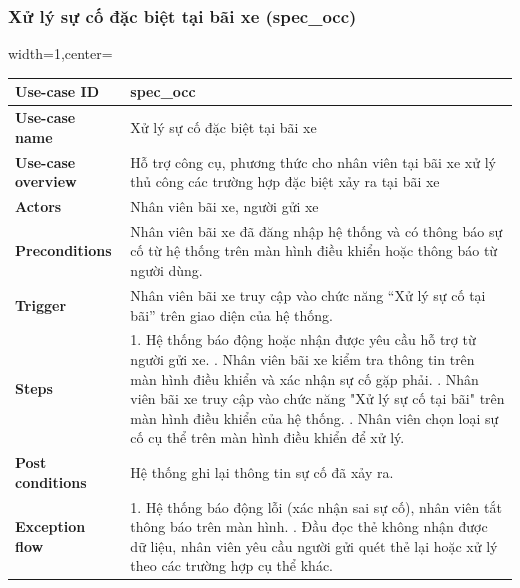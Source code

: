 \subsubsection{Xử lý sự cố đặc biệt tại bãi xe (spec\_occ)}
\begin{adjustbox}{width=1\textwidth,center=\textwidth}
\small
\begin{tabular}{|>{\centering\arraybackslash}m{3.5cm}|m{13.2cm}|}
\hline
\textbf{Use-case ID} & spec\_occ \\ \hline
\textbf{Use-case name} & Xử lý sự cố đặc biệt tại bãi xe  \\ \hline
\textbf{Use-case overview} & Hỗ trợ công cụ, phương thức cho nhân viên tại bãi xe xử lý thủ công các trường hợp đặc biệt xảy ra tại bãi xe   \\ \hline
\textbf{Actors} & Nhân viên bãi xe, người gửi xe  \\ \hline
\textbf{Preconditions} & Nhân viên bãi xe đã đăng nhập hệ thống và có thông báo sự cố từ hệ thống trên màn hình điều khiển hoặc thông báo từ người dùng. \\ \hline
\textbf{Trigger} & Nhân viên bãi xe truy cập vào chức năng “Xử lý sự cố tại bãi” trên giao diện của hệ thống. \\ \hline
\textbf{Steps} & 
1. Hệ thống báo động hoặc nhận được yêu cầu hỗ trợ từ người gửi xe. \newline
2. Nhân viên bãi xe kiểm tra thông tin trên màn hình điều khiển và xác nhận sự cố gặp phải. \newline
3. Nhân viên bãi xe truy cập vào chức năng "Xử lý sự cố tại bãi" trên màn hình điều khiển của hệ thống. \newline
4. Nhân viên chọn loại sự cố cụ thể trên màn hình điều khiển để xử lý. \\ \hline
\textbf{Post conditions} & Hệ thống ghi lại thông tin sự cố đã xảy ra. \\ \hline
\textbf{Exception flow} & 
1. Hệ thống báo động lỗi (xác nhận sai sự cố), nhân viên tắt thông báo trên màn hình. \newline
2. Đầu đọc thẻ không nhận được dữ liệu, nhân viên yêu cầu người gửi quét thẻ lại hoặc xử lý theo các trường hợp cụ thể khác. \\ \hline
\end{tabular}
\end{adjustbox}

